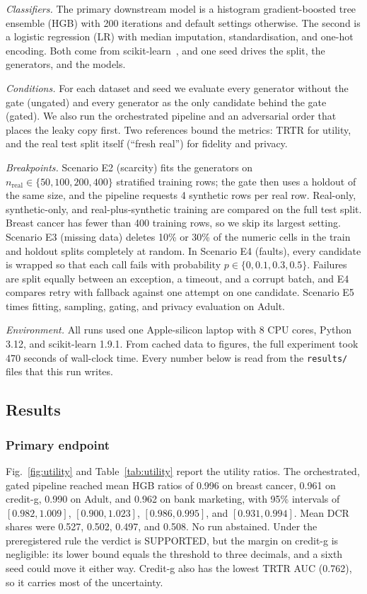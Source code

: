 \documentclass[journal]{IEEEtran}
\begin{document}
\emph{Classifiers.} The primary downstream model is a histogram gradient-boosted tree ensemble (HGB) with 200 iterations and default settings otherwise. The second is a logistic regression (LR) with median imputation, standardisation, and one-hot encoding. Both come from scikit-learn~\cite{pedregosa2011scikit}, and one seed drives the split, the generators, and the models.

\emph{Conditions.} For each dataset and seed we evaluate every generator without the gate (ungated) and every generator as the only candidate behind the gate (gated). We also run the orchestrated pipeline and an adversarial order that places the leaky copy first. Two references bound the metrics: TRTR for utility, and the real test split itself (``fresh real'') for fidelity and privacy.

\emph{Breakpoints.} Scenario E2 (scarcity) fits the generators on $n_{\mathrm{real}}\in\{50,100,200,400\}$ stratified training rows; the gate then uses a holdout of the same size, and the pipeline requests 4 synthetic rows per real row. Real-only, synthetic-only, and real-plus-synthetic training are compared on the full test split. Breast cancer has fewer than 400 training rows, so we skip its largest setting. Scenario E3 (missing data) deletes 10\% or 30\% of the numeric cells in the train and holdout splits completely at random. In Scenario E4 (faults), every candidate is wrapped so that each call fails with probability $p\in\{0,0.1,0.3,0.5\}$. Failures are split equally between an exception, a timeout, and a corrupt batch, and E4 compares retry with fallback against one attempt on one candidate. Scenario E5 times fitting, sampling, gating, and privacy evaluation on Adult.

\emph{Environment.} All runs used one Apple-silicon laptop with 8 CPU cores, Python 3.12, and scikit-learn 1.9.1. From cached data to figures, the full experiment took 470 seconds of wall-clock time. Every number below is read from the \texttt{results/} files that this run writes.

\subsection{Results}

\subsubsection{Primary endpoint}
Fig.~\ref{fig:utility} and Table~\ref{tab:utility} report the utility ratios. The orchestrated, gated pipeline reached mean HGB ratios of 0.996 on breast cancer, 0.961 on credit-g, 0.990 on Adult, and 0.962 on bank marketing, with 95\% intervals of $[0.982, 1.009]$, $[0.900, 1.023]$, $[0.986, 0.995]$, and $[0.931, 0.994]$. Mean DCR shares were 0.527, 0.502, 0.497, and 0.508. No run abstained. Under the preregistered rule the verdict is SUPPORTED, but the margin on credit-g is negligible: its lower bound equals the threshold to three decimals, and a sixth seed could move it either way. Credit-g also has the lowest TRTR AUC (0.762), so it carries most of the uncertainty.
\end{document}
